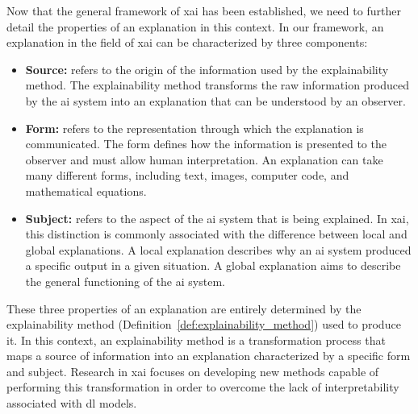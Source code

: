 Now that the general framework of \gls{xai} has been established, we need to further detail the properties of an explanation in this context.
In our framework, an explanation in the field of \gls{xai} can be characterized by three components:
\begin{itemize}
    \item \textbf{Source:}\label{item:source} refers to the origin of the information used by the explainability method.
    The explainability method transforms the raw information produced by the \gls{ai} system into an explanation that can be understood by an observer.

    \item \textbf{Form:}\label{item:form} refers to the representation through which the explanation is communicated.
    The form defines how the information is presented to the observer and must allow human interpretation.
    An explanation can take many different forms, including text, images, computer code, and mathematical equations.

    \item \textbf{Subject:}\label{item:subject} refers to the aspect of the \gls{ai} system that is being explained.
    In \gls{xai}, this distinction is commonly associated with the difference between local and global explanations.
    A local explanation describes why an \gls{ai} system produced a specific output in a given situation.
    A global explanation aims to describe the general functioning of the \gls{ai} system.
\end{itemize}

These three properties of an explanation are entirely determined by the explainability method (Definition~\ref{def:explainability_method}) used to produce it.
In this context, an explainability method is a transformation process that maps a source of information into an explanation characterized by a specific form and subject.
Research in \gls{xai} focuses on developing new methods capable of performing this transformation in order to overcome the lack of interpretability associated with \gls{dl} models.